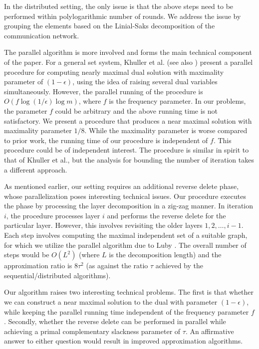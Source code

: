 \documentclass[11pt]{article}
\begin{document}
In the distributed setting, the only issue is that the above steps need to be performed within 
polylogarithmic number of rounds. We address the issue by grouping the elements
based on the Linial-Saks decomposition \cite{LS} of the communication network.

The parallel algorithm is more involved and forms the main technical component of the paper.
For a general set system, Khuller et al. \cite{KVY} (see also \cite{Gandhi}) 
present a parallel procedure for computing nearly maximal dual solution with maximality parameter of $(1-\epsilon)$,
using the idea of raising several dual variables simultaneously.
However, the parallel running of the procedure is $O(f\log(1/\epsilon)\log m)$, where $f$ is the frequency parameter.
In our problems, the parameter $f$ could be arbitrary and the above running time is not satisfactory.
We present a procedure that produces a near maximal solution with maximality parameter $1/8$.
While the maximality parameter is worse compared to prior work, the running time of our procedure is independent of $f$.
This procedure could be of independent interest. The procedure is similar in spirit to that of Khuller et al.,
but the analysis for bounding the number of iteration takes a different approach.

As mentioned earlier, our setting requires an additional reverse delete phase,
whose parallelization poses interesting technical issues.
Our procedure executes the phase by processing the layer decomposition in a zig-zag manner.
In iteration $i$, the procedure processes layer $i$ and performs the reverse delete for the particular layer.
However, this involves revisiting the older layers $1, 2, \ldots, i-1$.
Each step involves computing the maximal independent set of a suitable graph, for which we utilize
the parallel algorithm due to Luby \cite{Luby}.
The overall number of steps would be $O(L^2)$ (where $L$ is the decomposition length)
and the approximation ratio is $8\tau^2$ (as against the ratio $\tau$ achieved by the sequential/distributed algorithms).

Our algorithm raises two interesting technical problems.
The first is that whether we can construct a near maximal solution to the dual with parameter $(1-\epsilon)$,
while keeping the parallel running time independent of the frequency parameter $f$.
Secondly, whether the reverse delete can be performed in parallel while achieving a primal complementary
slackness parameter of $\tau$. An affirmative answer to either question would result in improved approximation algorithms.
\end{document}
